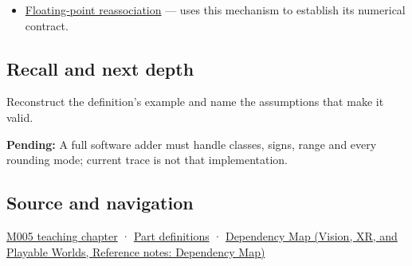 \begin{itemize}
\tightlist
\item
  \hyperref[appendix-c2ac4a84c283]{Floating-point reassociation} --- uses this mechanism to establish its numerical contract.
\end{itemize}

\subsection{Recall and next depth}\label{appendix-a1b1b4580dfd-recall-and-next-depth}

Reconstruct the definition's example and name the assumptions that make it valid.

\textbf{Pending:} A full software adder must handle classes, signs, range and every rounding mode; current trace is not that implementation.

\subsection{Source and navigation}\label{appendix-a1b1b4580dfd-source-and-navigation}

\hyperref[01-foundations-i-ch001-when-arithmetic-meets-uncertainty]{M005 teaching chapter} · \hyperref[appendix-fd090d982a15-m005---parts-77-88]{Part definitions} · \href{../07-Vision-XR-and-Playable-Worlds/main.pdf\#nameddest=appendix-4ad47bdd269a}{Dependency Map (Vision, XR, and Playable Worlds, Reference notes: Dependency Map)}
